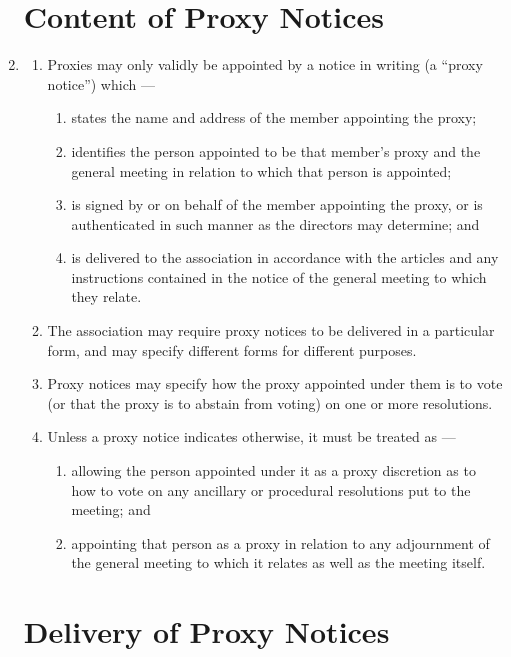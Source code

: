 \begin{enumerate}
\section{Content of Proxy Notices}

\item\label{proxies}
  \begin{enumerate}
  \item
    Proxies may only validly be appointed by a notice in writing (a
    ``proxy notice'') which ---
    \begin{enumerate}
    \item
      states the name and address of the member appointing the proxy;
    \item
      identifies the person appointed to be that member's proxy and the
      general meeting in relation to which that person is appointed;
    \item
      is signed by or on behalf of the member appointing the proxy, or is
      authenticated in such manner as the directors may determine; and
    \item
      is delivered to the association in accordance with the articles and any
      instructions contained in the notice of the general meeting to
      which they relate.
    \end{enumerate}
  \item
    The association may require proxy notices to be delivered in a
    particular form, and may specify different forms for different
    purposes.
  \item
    Proxy notices may specify how the proxy appointed under them is to
    vote (or that the proxy is to abstain from voting) on one or more
    resolutions.
  \item
    Unless a proxy notice indicates otherwise, it must be treated as ---
    \begin{enumerate}
    \item
      allowing the person appointed under it as a proxy discretion as to
      how to vote on any ancillary or procedural resolutions put to the
      meeting; and
    \item
      appointing that person as a proxy in relation to any adjournment of
      the general meeting to which it relates as well as the meeting
      itself.
    \end{enumerate}
  \end{enumerate}

\section{Delivery of Proxy Notices}


\end{enumerate}
